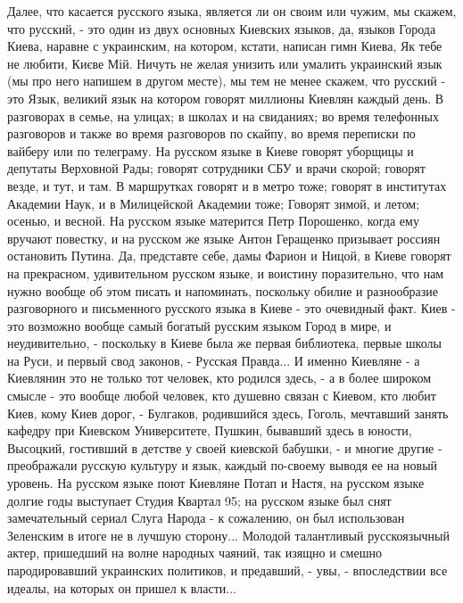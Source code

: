 Далее, что касается русского языка, является ли он своим или чужим, мы скажем,
что русский, - это один из двух основных Киевских языков, да, языков Города
Киева, наравне с украинским, на котором, кстати, написан гимн Киева, Як тебе не
любити, Києве Мій. Ничуть не желая унизить или умалить украинский язык (мы про
него напишем в другом месте), мы тем не менее скажем, что русский - это Язык,
великий язык на котором говорят миллионы Киевлян каждый день. В разговорах в
семье, на улицах; в школах и на свиданиях; во время телефонных разговоров и
также во время разговоров по скайпу, во время переписки по вайберу или по
телеграму. На русском языке в Киеве говорят уборщицы и депутаты Верховной Рады;
говорят сотрудники СБУ и врачи скорой; говорят везде, и тут, и там. В
маршрутках говорят и в метро тоже; говорят в институтах Академии Наук, и в
Милицейской Академии тоже; Говорят зимой, и летом; осенью, и весной. На русском
языке матерится Петр Порошенко, когда ему вручают повестку, и на русском же
языке Антон Геращенко призывает россиян остановить Путина. Да, представте себе,
дамы Фарион и Ницой, в Киеве говорят на прекрасном, удивительном русском языке,
и воистину поразительно, что нам нужно вообще об этом писать и напоминать,
поскольку обилие и разнообразие разговорного и письменного русского языка в
Киеве - это очевидный факт. Киев - это возможно вообще самый богатый русским
языком Город в мире, и неудивительно, - поскольку в Киеве была же первая библиотека, первые школы
на Руси, и первый свод законов, - Русская Правда... И именно Киевляне - а
Киевлянин это не только тот человек, кто родился здесь, - а в более широком
смысле - это вообще любой человек, кто душевно связан с Киевом, кто любит Киев,
кому Киев дорог, - Булгаков, родившийся здесь, Гоголь, мечтавший занять кафедру
при Киевском Университете, Пушкин, бывавший здесь в юности, Высоцкий, гостивший
в детстве у своей киевской бабушки, - и многие другие - преображали русскую
культуру и язык, каждый по-своему выводя ее на новый уровень.  На русском языке
поют Киевляне Потап и Настя, на русском языке долгие годы выступает Студия
Квартал 95; на русском языке был снят замечательный сериал Слуга Народа - к
сожалению, он был использован Зеленским в итоге не в лучшую сторону... Молодой
талантливый русскоязычный актер, пришедший на волне народных чаяний, так изящно
и смешно пародировавший украинских политиков, и предавший, - увы, -
впоследствии все идеалы, на которых он пришел к власти...    

